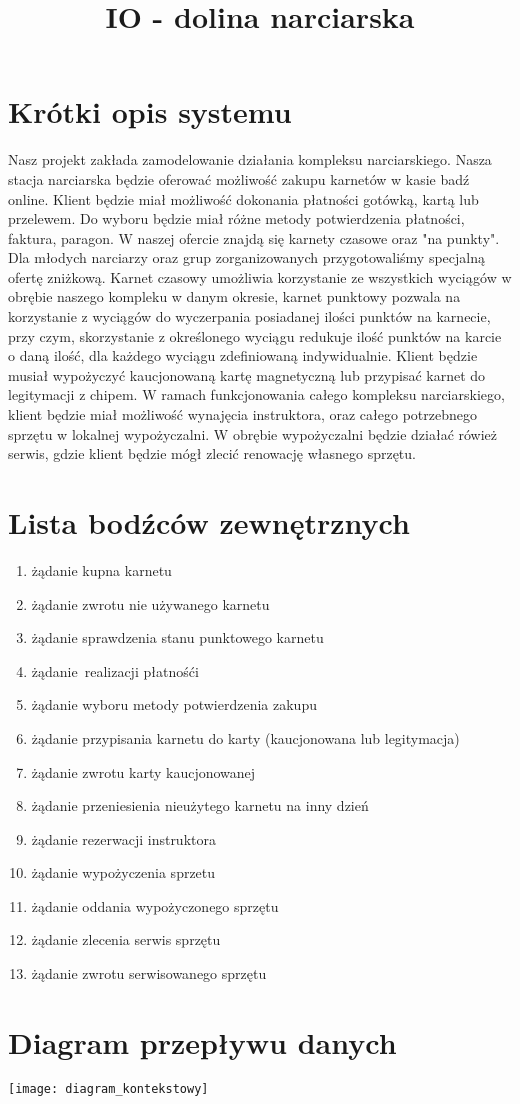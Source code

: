 \documentclass{sprawozdanie-agh}
\title{IO - dolina narciarska}
\begin{document}

\stronatytulowa{}

\section{Krótki opis systemu}
    \large
    Nasz projekt zakłada zamodelowanie działania kompleksu narciarskiego. Nasza stacja narciarska będzie oferować możliwość zakupu karnetów w kasie badź online. Klient będzie miał możliwość dokonania płatności gotówką, kartą lub przelewem. Do wyboru będzie miał różne metody potwierdzenia płatności, faktura, paragon. W naszej ofercie znajdą się karnety czasowe oraz "na punkty". Dla młodych narciarzy oraz grup zorganizowanych przygotowaliśmy specjalną ofertę zniżkową. Karnet czasowy umożliwia korzystanie ze wszystkich wyciągów w obrębie naszego kompleku w danym okresie, karnet punktowy pozwala na korzystanie z wyciągów do wyczerpania posiadanej ilości punktów na karnecie, przy czym, skorzystanie z określonego wyciągu redukuje ilość punktów na karcie o daną ilość, dla każdego wyciągu zdefiniowaną indywidualnie. Klient będzie musiał wypożyczyć kaucjonowaną kartę magnetyczną lub przypisać karnet do legitymacji z chipem. W ramach funkcjonowania całego kompleksu narciarskiego, klient będzie miał możliwość wynajęcia instruktora, oraz całego potrzebnego sprzętu w lokalnej wypożyczalni. W obrębie wypożyczalni będzie działać rówież serwis, gdzie klient będzie mógł zlecić renowację własnego sprzętu.

\section{Lista bodźców zewnętrznych}
    \begin{enumerate}
	\item żądanie kupna karnetu
        \item żądanie zwrotu nie używanego karnetu
        \item żądanie sprawdzenia stanu punktowego karnetu
        \item żądanie realizacji płatnośći
	\item żądanie wyboru metody potwierdzenia zakupu
	\item żądanie przypisania karnetu do karty (kaucjonowana lub legitymacja)
	\item żądanie zwrotu karty kaucjonowanej
	\item żądanie przeniesienia nieużytego karnetu na inny dzień
	\item żądanie rezerwacji instruktora
        \item żądanie wypożyczenia sprzetu
	\item żądanie oddania wypożyczonego sprzętu
	\item żądanie zlecenia serwis sprzętu
	\item żądanie zwrotu serwisowanego sprzętu
    \end{enumerate}

\newpage
\section{Diagram przepływu danych}
\begin{center}
    \texttt{[image: diagram\_kontekstowy]}
\end{center}
\end{document}
